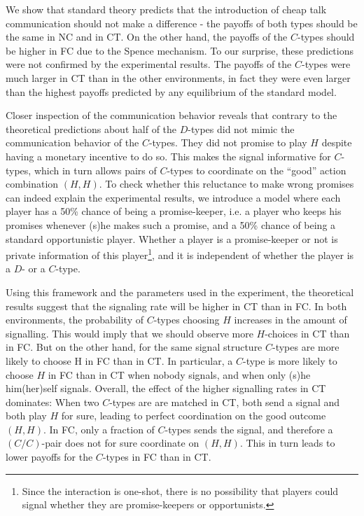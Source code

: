 \documentclass[12pt]{article}
\theoremstyle{break}
\begin{document}
We show that standard theory predicts that the introduction of cheap talk communication should not make a difference - the payoffs of both types should be the same in NC and in CT. On the other hand, the payoffs of the $C$-types should be higher in FC due to the Spence mechanism. To our surprise, these predictions were not confirmed by the experimental results. The payoffs of the $C$-types were much larger in CT than in the other environments, in fact they were even larger than the highest payoffs predicted by any equilibrium of the standard model.

Closer inspection of the communication behavior reveals that contrary to the theoretical predictions about half of the $D$-types did not mimic the communication behavior of the $C$-types. They did not promise to play $H$ despite having a monetary incentive to do so. This makes the signal informative for $C$-types, which in turn allows pairs of $C$-types to coordinate on the ``good'' action combination $(H,H)$. To check whether this reluctance to make wrong promises can indeed explain the experimental results, we introduce a model where each player has a 50\% chance of being a promise-keeper, i.e. a player who keeps his promises whenever (s)he makes such a promise, and a 50\% chance of being a standard opportunistic player. Whether a player is a promise-keeper or not is private information of this player\footnote{%
Since the interaction is one-shot, there is no possibility that players could signal whether they are promise-keepers or opportunists.}, and it is independent of whether the player is a $D$- or a $C$-type.

Using this framework and the parameters used in the experiment, the theoretical results suggest that the signaling rate will be higher in CT than in FC. In both environments, the probability of $C$-types choosing $H$ increases in the amount of signalling. This would imply that we should observe more $H$-choices in CT than in FC. But on the other hand, for the same signal structure $C$-types are more likely to choose H in FC than in CT. In particular, a $C$-type is more likely to choose $H$ in FC than in CT when nobody signals, and when only (s)he him(her)self signals. Overall, the effect of the higher signalling rates in CT dominates: When two $C$-types are are matched in CT, both send a signal and both play $H$ for sure, leading to perfect coordination on the good outcome $(H,H)$. In FC, only a fraction of $C$-types sends the signal, and therefore a $(C/C)$-pair does not for sure coordinate on $(H,H)$. This in turn leads to lower payoffs for the $C$-types in FC than in CT. 
\end{document}
